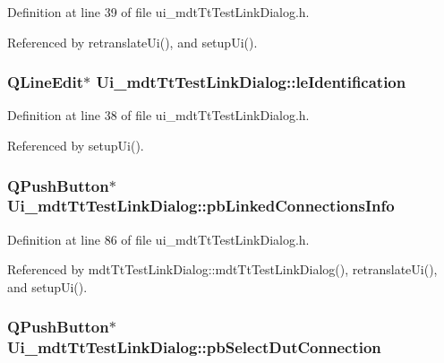 Definition at line 39 of file ui\-\_\-mdt\-Tt\-Test\-Link\-Dialog.\-h.



Referenced by retranslate\-Ui(), and setup\-Ui().

\hypertarget{class_ui__mdt_tt_test_link_dialog_a577c136ddb1185384b3d850f8e504880}{
\subsubsection[{le\-Identification}]{\setlength{\rightskip}{0pt plus 5cm}Q\-Line\-Edit$\ast$ Ui\-\_\-mdt\-Tt\-Test\-Link\-Dialog\-::le\-Identification}}\label{class_ui__mdt_tt_test_link_dialog_a577c136ddb1185384b3d850f8e504880}


Definition at line 38 of file ui\-\_\-mdt\-Tt\-Test\-Link\-Dialog.\-h.



Referenced by setup\-Ui().

\hypertarget{class_ui__mdt_tt_test_link_dialog_a9275a62604475933e72088868ec78915}{
\subsubsection[{pb\-Linked\-Connections\-Info}]{\setlength{\rightskip}{0pt plus 5cm}Q\-Push\-Button$\ast$ Ui\-\_\-mdt\-Tt\-Test\-Link\-Dialog\-::pb\-Linked\-Connections\-Info}}\label{class_ui__mdt_tt_test_link_dialog_a9275a62604475933e72088868ec78915}


Definition at line 86 of file ui\-\_\-mdt\-Tt\-Test\-Link\-Dialog.\-h.



Referenced by mdt\-Tt\-Test\-Link\-Dialog\-::mdt\-Tt\-Test\-Link\-Dialog(), retranslate\-Ui(), and setup\-Ui().

\hypertarget{class_ui__mdt_tt_test_link_dialog_a8247123004e99c89e119a99617579a60}{
\subsubsection[{pb\-Select\-Dut\-Connection}]{\setlength{\rightskip}{0pt plus 5cm}Q\-Push\-Button$\ast$ Ui\-\_\-mdt\-Tt\-Test\-Link\-Dialog\-::pb\-Select\-Dut\-Connection}}\label{class_ui__mdt_tt_test_link_dialog_a8247123004e99c89e119a99617579a60}


